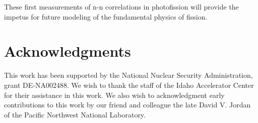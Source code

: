 \documentclass[%
 reprint,
 amsmath,amssymb,
 aps,
 nofootinbib
]{revtex4-1}
\begin{document}
These first measurements of n-n correlations in photofission will provide the impetus for future modeling of the fundamental physics of fission.

\section{Acknowledgments}
This work has been supported by the National Nuclear Security Administration, grant DE-NA002488. We wish to thank the staff of the Idaho Accelerator Center for their assistance in this work. We also wish to acknowledgment early contributions to this work by our friend and colleague the late David V. Jordan of the Pacific Northwest National Laboratory. 

%

\end{document}
